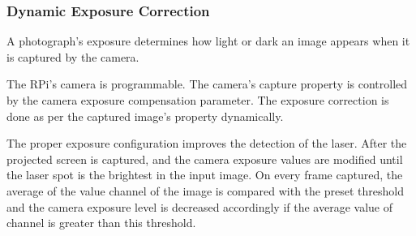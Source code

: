 \documentclass[12pt, a4paper]{article}
\begin{document}
	\subsubsection{Dynamic Exposure Correction}
	A photograph's exposure determines how light or dark an image appears when it is captured by the camera. 
	
	The RPi's camera is programmable. The camera's capture property is controlled by the camera exposure compensation parameter. The exposure correction is done as per the captured image's property dynamically. 
	
	The proper exposure configuration improves the detection of the laser. After the projected screen is captured, and the camera exposure values are modified until the laser spot is the brightest in the input image. On every frame captured, the average of the value channel of the image is compared with the preset threshold and the camera exposure level is decreased accordingly if the average value of channel is greater than this threshold.
	
	
\end{document}
